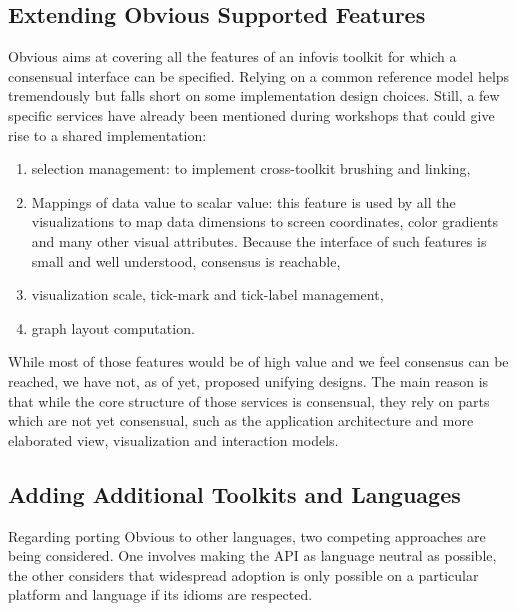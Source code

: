 
\subsection{Extending Obvious Supported Features}

Obvious aims at covering all the features of an infovis toolkit for
which a consensual interface can be specified.  Relying on a common
reference model helps tremendously but falls short on some
implementation design choices.  Still, a few specific services have
already been mentioned during workshops that could give rise to a
shared implementation:

\begin{enumerate}[noitemsep]
\item selection management: to implement cross-toolkit brushing and
  linking,
\item Mappings of data value to scalar value: this feature is used by
  all the visualizations to map data dimensions to screen coordinates,
  color gradients and many other visual attributes. Because the
  interface of such features is small and well understood, consensus
  is reachable,
\item visualization scale, tick-mark and tick-label management,
\item graph layout computation.
\end{enumerate}

While most of those features would be of high value and we feel
consensus can be reached, we have not, as of yet, proposed unifying
designs.  The main reason is that while the core structure of those
services is consensual, they rely on parts which are not yet
consensual, such as the application architecture and more elaborated
view, visualization and interaction models.

\subsection{Adding Additional Toolkits and Languages}

Regarding porting Obvious to other languages, two competing approaches
are being considered.  One involves making the API as language neutral
as possible, the other considers that widespread adoption is only
possible on a particular platform and language if its idioms are
respected.

